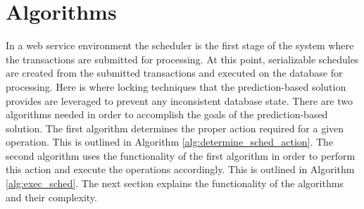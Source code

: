 \documentclass[conference]{IEEEtran}
\begin{document}
\section{Algorithms}
\label{sec:algorithms}
In a web service environment the scheduler is the first stage of the system where the transactions are submitted for processing. At this point, serializable schedules are created from the submitted transactions and executed on the database for processing. Here is where locking techniques that the prediction-based solution provides are leveraged to prevent any inconsistent database state. There are two algorithms needed in order to accomplish the goals of the prediction-based solution. The first algorithm determines the proper action required for a given operation. This is outlined in Algorithm \ref{alg:determine_sched_action}. The second algorithm uses the functionality of the first algorithm in order to perform this action and execute the operations accordingly. This is outlined in Algorithm \ref{alg:exec_sched}. The next section explains the functionality of the algorithms and their complexity.

\end{document}
